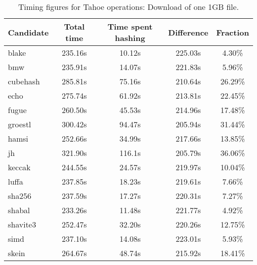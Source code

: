 \begin{table}[h]
  \centering
  \begin{tabular}{ | l | c | c | c | c | }
    \hline
    Candidate & Total time & Time spent hashing & Difference & Fraction \\ \hline
    blake & 235.16s & 10.12s & 225.03s & 4.30\% \\ \hline
    bmw & 235.91s & 14.07s & 221.83s & 5.96\% \\ \hline
    cubehash & 285.81s & 75.16s & 210.64s & 26.29\% \\ \hline
    echo & 275.74s & 61.92s & 213.81s & 22.45\% \\ \hline
    fugue & 260.50s & 45.53s & 214.96s & 17.48\% \\ \hline
    groestl & 300.42s & 94.47s & 205.94s & 31.44\% \\ \hline
    hamsi & 252.66s & 34.99s & 217.66s & 13.85\% \\ \hline
    jh & 321.90s & 116.1s & 205.79s & 36.06\% \\ \hline
    keccak & 244.55s & 24.57s & 219.97s & 10.04\% \\ \hline
    luffa & 237.85s & 18.23s & 219.61s & 7.66\% \\ \hline
    sha256 & 237.59s & 17.27s & 220.31s & 7.27\% \\ \hline
    shabal & 233.26s & 11.48s & 221.77s & 4.92\% \\ \hline
    shavite3 & 252.47s & 32.20s & 220.26s & 12.75\% \\ \hline
    simd & 237.10s & 14.08s & 223.01s & 5.93\% \\ \hline
    skein & 264.67s & 48.74s & 215.92s & 18.41\% \\ \hline
  \end{tabular}
  \caption{Timing figures for Tahoe operations: Download of one 1GB file.}
  \label{tbl:hashingtimes:get1gb}
\end{table}
